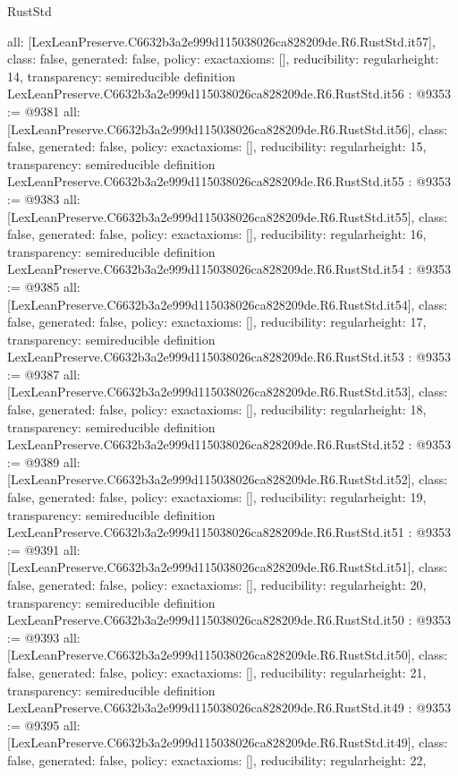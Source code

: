 \begin{lexlean}{RustStd}
\begin{coremodule}
{  all: [LexLeanPreserve.C6632b3a2e999d115038026ca828209de.R6.RustStd.it57],
  class: false,
  generated: false,
  policy: exact{axioms: []},
  reducibility: regular{height: 14},
  transparency: semireducible
}
definition LexLeanPreserve.C6632b3a2e999d115038026ca828209de.R6.RustStd.it56 : @9353 := @9381 {
  all: [LexLeanPreserve.C6632b3a2e999d115038026ca828209de.R6.RustStd.it56],
  class: false,
  generated: false,
  policy: exact{axioms: []},
  reducibility: regular{height: 15},
  transparency: semireducible
}
definition LexLeanPreserve.C6632b3a2e999d115038026ca828209de.R6.RustStd.it55 : @9353 := @9383 {
  all: [LexLeanPreserve.C6632b3a2e999d115038026ca828209de.R6.RustStd.it55],
  class: false,
  generated: false,
  policy: exact{axioms: []},
  reducibility: regular{height: 16},
  transparency: semireducible
}
definition LexLeanPreserve.C6632b3a2e999d115038026ca828209de.R6.RustStd.it54 : @9353 := @9385 {
  all: [LexLeanPreserve.C6632b3a2e999d115038026ca828209de.R6.RustStd.it54],
  class: false,
  generated: false,
  policy: exact{axioms: []},
  reducibility: regular{height: 17},
  transparency: semireducible
}
definition LexLeanPreserve.C6632b3a2e999d115038026ca828209de.R6.RustStd.it53 : @9353 := @9387 {
  all: [LexLeanPreserve.C6632b3a2e999d115038026ca828209de.R6.RustStd.it53],
  class: false,
  generated: false,
  policy: exact{axioms: []},
  reducibility: regular{height: 18},
  transparency: semireducible
}
definition LexLeanPreserve.C6632b3a2e999d115038026ca828209de.R6.RustStd.it52 : @9353 := @9389 {
  all: [LexLeanPreserve.C6632b3a2e999d115038026ca828209de.R6.RustStd.it52],
  class: false,
  generated: false,
  policy: exact{axioms: []},
  reducibility: regular{height: 19},
  transparency: semireducible
}
definition LexLeanPreserve.C6632b3a2e999d115038026ca828209de.R6.RustStd.it51 : @9353 := @9391 {
  all: [LexLeanPreserve.C6632b3a2e999d115038026ca828209de.R6.RustStd.it51],
  class: false,
  generated: false,
  policy: exact{axioms: []},
  reducibility: regular{height: 20},
  transparency: semireducible
}
definition LexLeanPreserve.C6632b3a2e999d115038026ca828209de.R6.RustStd.it50 : @9353 := @9393 {
  all: [LexLeanPreserve.C6632b3a2e999d115038026ca828209de.R6.RustStd.it50],
  class: false,
  generated: false,
  policy: exact{axioms: []},
  reducibility: regular{height: 21},
  transparency: semireducible
}
definition LexLeanPreserve.C6632b3a2e999d115038026ca828209de.R6.RustStd.it49 : @9353 := @9395 {
  all: [LexLeanPreserve.C6632b3a2e999d115038026ca828209de.R6.RustStd.it49],
  class: false,
  generated: false,
  policy: exact{axioms: []},
  reducibility: regular{height: 22},
}
\end{coremodule}
\end{lexlean}
